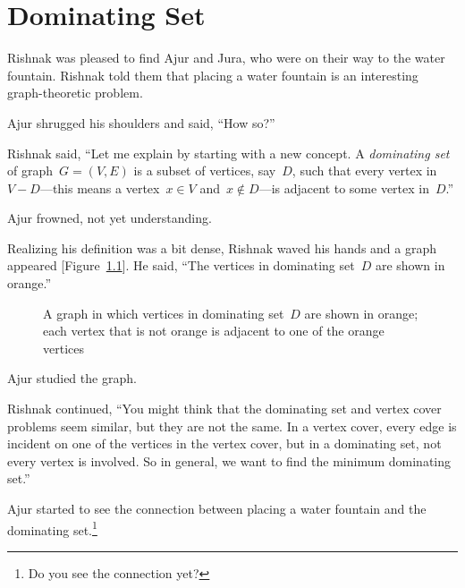 \chapter{Dominating Set}

Rishnak was pleased to find Ajur and Jura, who were on their way to the water fountain. Rishnak told them that placing a water fountain is an interesting graph-theoretic problem.

Ajur shrugged his shoulders and said, ``How so?''

Rishnak said, ``Let me explain by starting with a new concept.  A \textit{dominating set} of graph~$G=(V,E)$ is a subset of vertices, say~$D$, such that every vertex in~$V-D$---this means a vertex~$x\in V$ and~$x\notin D$---is adjacent to some vertex in~$D$.'' 

Ajur frowned, not yet understanding.

Realizing his definition was a bit dense, Rishnak waved his hands and a graph appeared [Figure~\ref{18g1}]. He said, ``The vertices in dominating set~$D$ are shown in orange.''

\begin{figure}
\begin{center}
\caption{A graph in which vertices in dominating set~$D$ are shown in orange; each vertex that is not orange is adjacent to one of the orange vertices}\label{18g1}
\end{center}
\end{figure}

Ajur studied the graph.

Rishnak continued, ``You might think that the dominating set and vertex cover problems seem similar, but they are not the same. In a vertex cover, every edge is incident on one of the vertices in the vertex cover, but in a dominating set, not every vertex is involved.  So in general, we want to find the minimum dominating set.''

Ajur started to see the connection between placing a water fountain and the dominating set.\footnote{Do you see the connection yet?}

